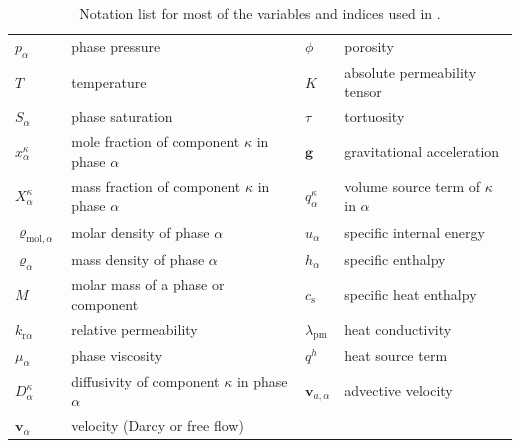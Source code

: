 \begin{table}
\begin{tabular}{llll}
$p_\alpha$ & phase pressure & $\phi$ & porosity \\
$T$ & temperature & $K$ & absolute permeability tensor \\
$S_\alpha$ & phase saturation & $\tau$ & tortuosity \\
$x_\alpha^\kappa$ & mole fraction of component $\kappa$ in phase $\alpha$ & $\boldsymbol{g}$ & gravitational acceleration \\
$X_\alpha^\kappa$ & mass fraction of component $\kappa$ in phase $\alpha$ & $q^\kappa_\alpha$ & volume source term of $\kappa$ in $\alpha$ \\
$\varrho_{\text{mol},\alpha}$ & molar density of phase $\alpha$ & $u_\alpha$ & specific internal energy \\
$\varrho_{\alpha}$ & mass density of phase $\alpha$ & $h_\alpha$ & specific enthalpy \\
$M$ & molar mass of a phase or component & $c_\text{s}$ & specific heat enthalpy \\
$k_{\text{r}\alpha}$ & relative permeability & $\lambda_\text{pm}$ & heat conductivity \\
$\mu_\alpha$ & phase viscosity & $q^h$ & heat source term \\
$D_\alpha^\kappa$ & diffusivity of component $\kappa$ in phase $\alpha$ & $\boldsymbol{v}_{a,\alpha}$  & advective velocity \\
$\boldsymbol{v}_\alpha$ & velocity (Darcy or free flow)& & \\
\end{tabular}
\caption{Notation list for most of the variables and indices used in \Dumux.}

\end{table}

